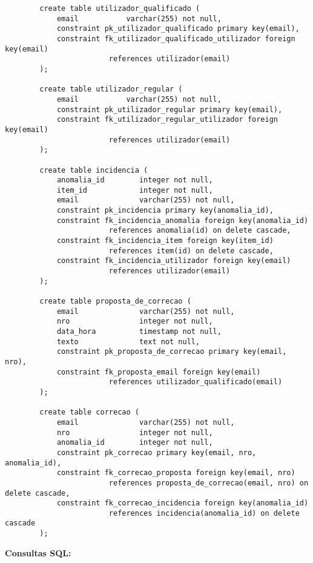 \documentclass[12pt]{report}
\begin{document}
\begin{verbatim}
        create table utilizador_qualificado (
            email           varchar(255) not null,
            constraint pk_utilizador_qualificado primary key(email),
            constraint fk_utilizador_qualificado_utilizador foreign key(email)
                        references utilizador(email)
        );

        create table utilizador_regular (
            email           varchar(255) not null,
            constraint pk_utilizador_regular primary key(email),
            constraint fk_utilizador_regular_utilizador foreign key(email)
                        references utilizador(email)
        );

        create table incidencia (
            anomalia_id        integer not null,
            item_id            integer not null,
            email              varchar(255) not null,
            constraint pk_incidencia primary key(anomalia_id),
            constraint fk_incidencia_anomalia foreign key(anomalia_id)
                        references anomalia(id) on delete cascade,
            constraint fk_incidencia_item foreign key(item_id)
                        references item(id) on delete cascade,
            constraint fk_incidencia_utilizador foreign key(email)
                        references utilizador(email)
        );

        create table proposta_de_correcao (
            email              varchar(255) not null,
            nro                integer not null,
            data_hora          timestamp not null,                  
            texto              text not null,
            constraint pk_proposta_de_correcao primary key(email, nro),
            constraint fk_proposta_email foreign key(email)
                        references utilizador_qualificado(email)
        );

        create table correcao (
            email              varchar(255) not null,
            nro                integer not null,
            anomalia_id        integer not null,
            constraint pk_correcao primary key(email, nro, anomalia_id),
            constraint fk_correcao_proposta foreign key(email, nro)
                        references proposta_de_correcao(email, nro) on delete cascade,
            constraint fk_correcao_incidencia foreign key(anomalia_id)
                        references incidencia(anomalia_id) on delete cascade
        );         
    \end{verbatim}

    \Large 
    \textbf{Consultas SQL:}
\end{document}

